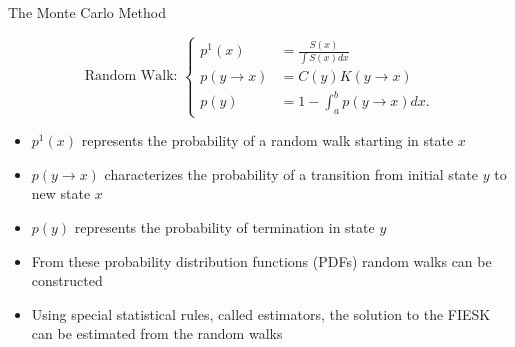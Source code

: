 \documentclass{beamer}
\begin{document}

\begin{frame}{The Monte Carlo Method}

  \begin{equation*}
    \text{Random Walk: }
    \begin{cases}
      p^1(x) & = \frac{S(x)}{\int S(x)dx} \\ 
      p(y \to x) & = C(y)K(y \to x)  \\
      p(y) & = 1 - \int_a^b p(y \to x) dx.
    \end{cases}
    \label{eq:mc_random_walk_pdfs}
  \end{equation*}

  \bigskip

  \begin{itemize}
    \item $p^1(x)$ represents the probability of a random walk starting in
      state $x$
      \medskip
    \item $p(y \to x)$ characterizes the probability of a transition from
      initial state $y$ to new state $x$
      \medskip
    \item $p(y)$ represents the probability of termination in state $y$
      \medskip
    \item From these probability distribution functions (PDFs) random walks
      can be constructed
      \medskip
    \item Using special statistical rules, called estimators, the solution to
      the FIESK can be estimated from the random walks
  \end{itemize}

\end{frame}

\end{document}
